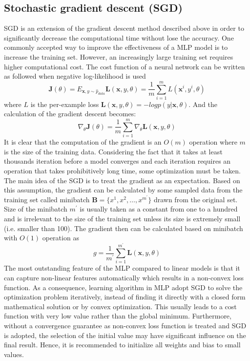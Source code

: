 \subsection{Stochastic gradient descent (SGD)}
\label{lr_sec:ml_sgd}
SGD is an extension of the gradient descent method described above in order to significantly decrease the computational time without lose the accuracy.
One commonly accepted way to improve the effectiveness of a MLP model is to increase the training set.
However, an increasingly large training set requires higher computational cost.
The cost function of a neural network can be written as followed when negative log-likelihood is used
\begin{equation}
    \mathbf{J}(\theta) = E_{\mathbf{x},y\sim\hat{p}_{data}}\mathbf{L}(\mathbf{x},y,\theta)
    =\frac{1}{m}\sum^m_{i=1}L(\mathbf{x}^{i},y^{i},\theta)
\end{equation}
%
where $L$ is the per-example loss $\mathbf{L}(\mathbf{x},y,\theta)=-log p(y|\mathbf{x},\theta)$.
And the calculation of the gradient descent becomes:
\begin{equation}
    \nabla_{\theta} \mathbf{J}(\theta)
    =\frac{1}{m}\sum^m_{i=1}\nabla_\theta \mathbf{L} (\mathbf{x},y,\theta)
\end{equation}
%
It is clear that the computation of the gradient is an $O(m)$ operation where $m$ is the size of the training data.
Considering the fact that it takes at least thousands iteration before a model converges and each iteration requires an operation that takes prohibitively long time, some optimization must be taken.
The main idea of the SGD is to treat the gradient as an expectation.
Based on this assumption, the gradient can be calculated by some sampled data from the training set called minibatch $\mathbf{B}=\{x^{1},x^{2},\dots,x^{m^\prime}\}$ drawn from the original set.
Size of the minibatch $m^\prime$ is usually taken as a constant from one to a hundred and is irrelevant to the size of the training set unless its size is extremely small (i.e. smaller than 100).
The gradient then can be calculated based on minibatch with $O(1)$ operation as
\begin{equation}
    g
    =\frac{1}{m^\prime} \sum^{m^\prime}_{i=1} \mathbf{L} (\mathbf{x},y,\theta)
\end{equation}
%
The most outstanding feature of the MLP compared to linear models is that it can capture non-linear features automatically which results in a non-convex loss function.
As a consequence, learning algorithm in MLP adopt SGD to solve the optimization problem iteratively, instead of finding it directly with a closed form mathematical solution or by convex optimization.
This usually leads to a cost function with very low value rather than the global minimum.
Furthermore, without a convergence guarantee as non-convex loss function is treated and SGD is adopted, the selection of the initial value may have significant influence on the final result.
Hence, it is recommended to initialize all weights and bias to small values.

